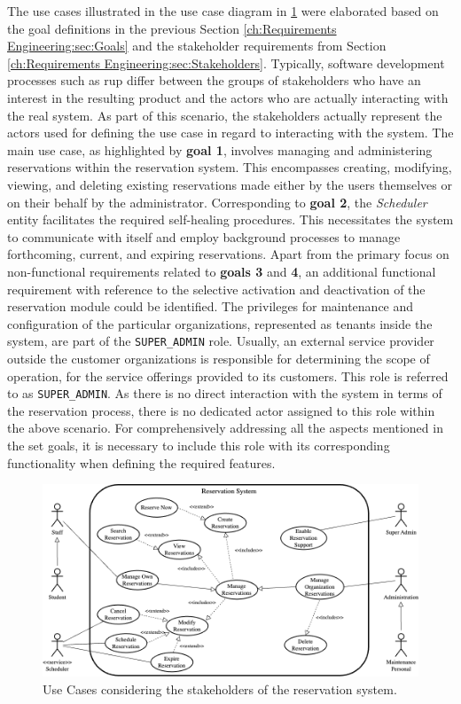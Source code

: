 The use cases illustrated in the use case diagram in \ref{fig:use-cases} were elaborated based on the goal definitions in the previous Section \ref{ch:Requirements Engineering:sec:Goals} and the stakeholder requirements from Section \ref{ch:Requirements Engineering:sec:Stakeholders}.
Typically, software development processes such as \acrshort{rup} \cite{kruchten_rational_1999} differ between the groups of stakeholders who have an interest in the resulting product and the actors who are actually interacting with the real system. 
As part of this scenario, the stakeholders actually represent the actors used for defining the use case in regard to interacting with the system.
The main use case, as highlighted by \textbf{goal 1}, involves managing and administering reservations within the reservation system. This encompasses creating, modifying, viewing, and deleting existing reservations made either by the users themselves or on their behalf by the administrator.
Corresponding to \textbf{goal 2}, the \textit{Scheduler} entity facilitates the required self-healing procedures. This necessitates the system to communicate with itself and employ background processes to manage forthcoming, current, and expiring reservations.
Apart from the primary focus on non-functional requirements related to \textbf{goals 3} and \textbf{4}, an additional functional requirement with reference to the selective activation and deactivation of the reservation module could be identified.
The privileges for maintenance and configuration of the particular organizations, represented as tenants inside the system, are part of the \verb|SUPER_ADMIN| role.
Usually, an external service provider outside the customer organizations is responsible for determining the scope of operation, for the service offerings provided to its customers. This role is referred to as \verb|SUPER_ADMIN|. As there is no direct interaction with the system in terms of the reservation process, there is no dedicated actor assigned to this role within the above scenario.
For comprehensively addressing all the aspects mentioned in the set goals, it is necessary to include this role with its corresponding functionality when defining the required features.

\begin{figure}[h]
    \centering
    \includegraphics[scale=0.4]{resources/images/main/2_requirements_engineering/UseCases.png}
    \caption{Use Cases considering the stakeholders of the reservation system.}
    \label{fig:use-cases}
\end{figure}
